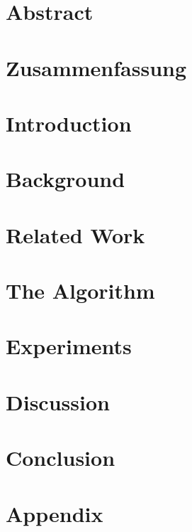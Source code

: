 \documentclass[12pt]{scrbook}
\renewcommand{\chapterheadstartvskip}{\vspace{0pt}}
\renewcommand{\chapterheadendvskip}{\vspace{\baselineskip}}
\begin{document}
\chapter*{Abstract}

%
\chapter*{Zusammenfassung}

%
\tableofcontents
%
%
\chapter{Introduction}
\label{introduction}

%
\chapter{Background}
\label{background}


\chapter{Related Work}
\label{related}

%
\chapter{The Algorithm}
\label{algorithm}

%
\chapter{Experiments}
\label{experiments}

%
\chapter{Discussion}
\label{discussion}

%
\chapter{Conclusion}

%
\printbibliography
%
\renewcommand{\chapterheadstartvskip}{\vspace{-2.5ex}}
\renewcommand{\chapterheadendvskip}{\vspace{-2ex}}
\setcounter{figure}{0}
\setcounter{table}{0}
\renewcommand{\thefigure}{A.\arabic{figure}}
\renewcommand{\thetable}{A.\arabic{table}}
\chapter*{Appendix}  %


%
\end{document}
